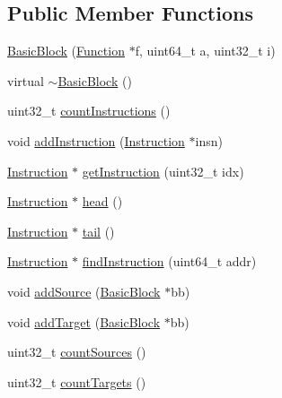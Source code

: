 \subsection*{\-Public \-Member \-Functions}
\begin{DoxyCompactItemize}
\item 
\hyperlink{class_e_p_a_x_1_1_basic_block_adf527ffb872f3969f891d6506973fac7}{\-Basic\-Block} (\hyperlink{class_e_p_a_x_1_1_function}{\-Function} $\ast$f, uint64\-\_\-t a, uint32\-\_\-t i)
\item 
virtual \hyperlink{class_e_p_a_x_1_1_basic_block_ad142c305b9158af0a3eb0d7dceb95b3f}{$\sim$\-Basic\-Block} ()
\item 
uint32\-\_\-t \hyperlink{class_e_p_a_x_1_1_basic_block_a72cd48f6ceb9f2d0085ff56b6936f21d}{count\-Instructions} ()
\item 
void \hyperlink{class_e_p_a_x_1_1_basic_block_a113ee43c4b6d28faabc9a07cd6ffdbef}{add\-Instruction} (\hyperlink{class_e_p_a_x_1_1_instruction}{\-Instruction} $\ast$insn)
\item 
\hyperlink{class_e_p_a_x_1_1_instruction}{\-Instruction} $\ast$ \hyperlink{class_e_p_a_x_1_1_basic_block_af786852087748a3b29b562936da3e8ba}{get\-Instruction} (uint32\-\_\-t idx)
\item 
\hyperlink{class_e_p_a_x_1_1_instruction}{\-Instruction} $\ast$ \hyperlink{class_e_p_a_x_1_1_basic_block_ac27e14d15376e0741deb54ad108f8c32}{head} ()
\item 
\hyperlink{class_e_p_a_x_1_1_instruction}{\-Instruction} $\ast$ \hyperlink{class_e_p_a_x_1_1_basic_block_a3e4a6d47bdb5fbb33d6bfbca91a1166e}{tail} ()
\item 
\hyperlink{class_e_p_a_x_1_1_instruction}{\-Instruction} $\ast$ \hyperlink{class_e_p_a_x_1_1_basic_block_a840f0766e1a9f722c5fa45b9f80ea851}{find\-Instruction} (uint64\-\_\-t addr)
\item 
void \hyperlink{class_e_p_a_x_1_1_basic_block_a818a061ab831a990433768592a0d0e34}{add\-Source} (\hyperlink{class_e_p_a_x_1_1_basic_block}{\-Basic\-Block} $\ast$bb)
\item 
void \hyperlink{class_e_p_a_x_1_1_basic_block_ac8a478ce07ea5579259e8e8f3c96224c}{add\-Target} (\hyperlink{class_e_p_a_x_1_1_basic_block}{\-Basic\-Block} $\ast$bb)
\item 
uint32\-\_\-t \hyperlink{class_e_p_a_x_1_1_basic_block_a315a66b3a674593333254f214894be5d}{count\-Sources} ()
\item 
uint32\-\_\-t \hyperlink{class_e_p_a_x_1_1_basic_block_a2d9e1867b5d1dbbd0ab8d6feb3b0f236}{count\-Targets} ()

\end{DoxyCompactItemize}
